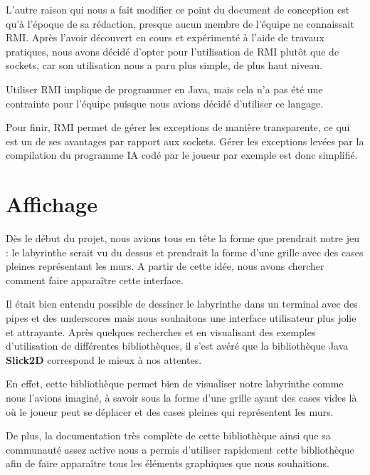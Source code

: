 	L'autre raison qui nous a fait modifier ce point du document de conception est qu'à l'époque de sa rédaction, presque aucun membre de l'équipe ne connaissait RMI. Après l'avoir découvert en cours et expérimenté à l'aide de travaux pratiques, nous avons décidé d'opter pour l'utilisation de RMI plutôt que de sockets, car son utilisation nous a paru plus simple, de plus haut niveau.
	
	Utiliser RMI implique de programmer en Java, mais cela n'a pas été une contrainte pour l'équipe puisque nous avions décidé d'utiliser ce langage.
	
	Pour finir, RMI permet de gérer les exceptions de manière transparente, ce qui est un de ses avantages par rapport aux sockets. Gérer les exceptions levées par la compilation du programme IA codé par le joueur par exemple est donc simplifié.

\section{Affichage}
	Dès le début du projet, nous avions tous en tête la forme que prendrait notre jeu : le labyrinthe serait vu du dessus et prendrait la forme d'une grille avec des cases pleines représentant les murs. A partir de cette idée, nous avons chercher comment faire apparaître cette interface.
	
	Il était bien entendu possible de dessiner le labyrinthe dans un terminal avec des pipes et des underscores mais nous souhaitons une interface utilisateur plus jolie et attrayante. Après quelques recherches et en visualisant des exemples d'utilisation de différentes bibliothèques, il s'est avéré que la bibliothèque Java \textbf{Slick2D} correspond le mieux à nos attentes.

    En effet, cette bibliothèque permet bien de visualiser notre labyrinthe comme nous l'avions imaginé, à savoir sous la forme d'une grille ayant des cases vides là où le joueur peut se déplacer et des cases pleines qui représentent les murs.

    De plus, la documentation très complète de cette bibliothèque ainsi que sa communauté assez active nous a permis d'utiliser rapidement cette bibliothèque afin de faire apparaître tous les éléments graphiques que nous souhaitions.
